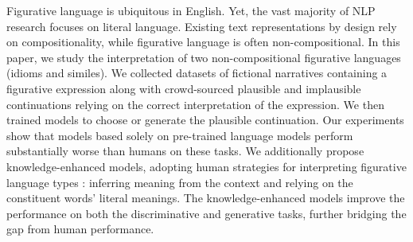 Figurative language is ubiquitous in English. Yet, the vast majority of NLP research focuses on literal language. Existing text representations by design rely on compositionality, while figurative language is often non-compositional. In this paper, we study the interpretation of two non-compositional figurative languages (idioms and similes). We collected datasets of fictional narratives containing a figurative expression along with crowd-sourced plausible and implausible continuations relying on the correct interpretation of the expression. We then trained models to choose or generate the plausible continuation. Our experiments show that models based solely on pre-trained language models perform substantially worse than humans on these tasks. We additionally propose knowledge-enhanced models, adopting human strategies for interpreting figurative language types : inferring meaning from the context and relying on the constituent words' literal meanings. The knowledge-enhanced models improve the performance on both the discriminative and generative tasks, further bridging the gap from human performance.
\vspace{-2ex}
